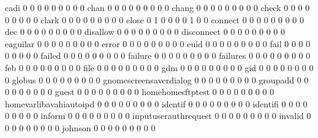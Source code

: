 \documentclass[compress,8pt]{beamer}
\begin{document}
\begin{frame}
\begin{Schunk}
  cadi                                       0   0   0   0   0   0   0   0   0
  chan                                       0   0   0   0   0   0   0   0   0
  chang                                      0   0   0   0   0   0   0   0   0
  check                                      0   0   0   0   0   0   0   0   0
  clark                                      0   0   0   0   0   0   0   0   0
  close                                      0   1   0   0   0   0   1   0   0
  connect                                    0   0   0   0   0   0   0   0   0
  dec                                        0   0   0   0   0   0   0   0   0
  disallow                                   0   0   0   0   0   0   0   0   0
  disconnect                                 0   0   0   0   0   0   0   0   0
  eaguilar                                   0   0   0   0   0   0   0   0   0
  error                                      0   0   0   0   0   0   0   0   0
  euid                                       0   0   0   0   0   0   0   0   0
  fail                                       0   0   0   0   0   0   0   0   0
  failed                                     0   0   0   0   0   0   0   0   0
  failure                                    0   0   0   0   0   0   0   0   0
  failures                                   0   0   0   0   0   0   0   0   0
  feb                                        0   0   0   0   0   0   0   0   0
  file                                       0   0   0   0   0   0   0   0   0
  gdm                                        0   0   0   0   0   0   0   0   0
  gid                                        0   0   0   0   0   0   0   0   0
  globus                                     0   0   0   0   0   0   0   0   0
  gnomescreensaverdialog                     0   0   0   0   0   0   0   0   0
  groupadd                                   0   0   0   0   0   0   0   0   0
  guest                                      0   0   0   0   0   0   0   0   0
  homehomesftptest                           0   0   0   0   0   0   0   0   0
  homevarlibavahiautoipd                     0   0   0   0   0   0   0   0   0
  identif                                    0   0   0   0   0   0   0   0   0
  identifi                                   0   0   0   0   0   0   0   0   0
  inform                                     0   0   0   0   0   0   0   0   0
  inputuserauthrequest                       0   0   0   0   0   0   0   0   0
  invalid                                    0   0   0   0   0   0   0   0   0
  johnson                                    0   0   0   0   0   0   0   0   0

\end{Schunk}
\end{frame}
\end{document}
